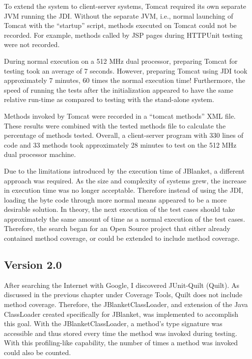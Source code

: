 To extend the system to client-server systems, Tomcat required its own
separate JVM running the JDI.  Without the separate JVM, i.e., normal
launching of Tomcat with the ``startup'' script, methods executed on Tomcat
could not be recorded.  For example, methods called by JSP pages during
HTTPUnit testing were not recorded.

During normal execution on a 512 MHz dual processor, preparing Tomcat for
testing took an average of 7 seconds.  However, preparing Tomcat using JDI
took approximately 7 minutes, 60 times the normal execution time!
Furthermore, the speed of running the tests after the initialization
appeared to have the same relative run-time as compared to testing with the
stand-alone system.

Methods invoked by Tomcat were recorded in a ``tomcat methods'' XML file.
These results were combined with the tested methods file to calculate the
percentage of methods tested.  Overall, a client-server program with 330
lines of code and 33 methods took approximately 28 minutes to test on the
512 MHz dual processor machine.

Due to the limitations introduced by the execution time of JBlanket, a
different approach was required.  As the size and complexity of systems
grew, the increase in execution time was no longer acceptable.  Therefore
instead of using the JDI, loading the byte code through more normal means
appeared to be a more desirable solution.  In theory, the next execution of
the test cases should take approximately the same amount of time as a
normal execution of the test cases.  Therefore, the search began for an
Open Source project that either already contained method coverage, or could
be extended to include method coverage.

\subsection{Version 2.0}
After searching the Internet with Google, I discovered JUnit-Quilt (Quilt).
As discussed in the previous chapter under Coverage Tools, Quilt does not
include method coverage.  Therefore, the JBlanketClassLoader, and extension
of the Java ClassLoader created specifically for JBlanket, was implemented
to accomplish this goal.  With the JBlanketClassLoader, a method's type
signature was accessible and thus stored every time the method was invoked
during testing.  With this profiling-like capability, the number of times a
method was invoked could also be counted.

